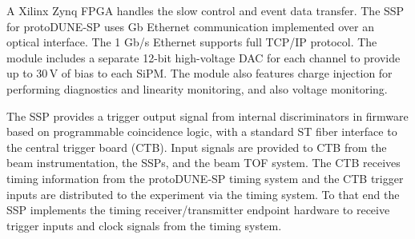 A Xilinx Zynq FPGA handles the slow control and event data transfer.  
The SSP for protoDUNE-SP uses Gb Ethernet communication implemented over an optical interface.
The 1 Gb/s Ethernet supports full TCP/IP protocol.  
The module includes a separate 12-bit high-voltage DAC for each channel to 
provide up to 30\,V of bias to each SiPM.  
The module also features charge injection for performing diagnostics and linearity 
monitoring, and also voltage monitoring.


The SSP provides a trigger output signal from internal discriminators in firmware based on programmable
coincidence logic, with a standard ST fiber interface to the central trigger board (CTB).
Input signals are provided to CTB from the beam instrumentation, the SSPs, and the beam TOF system.
The CTB receives timing information from the protoDUNE-SP timing system and the CTB trigger inputs are distributed to 
the experiment via the timing system.
To that end the SSP implements the timing receiver/transmitter endpoint hardware to receive trigger inputs and clock signals from the timing system.
%



